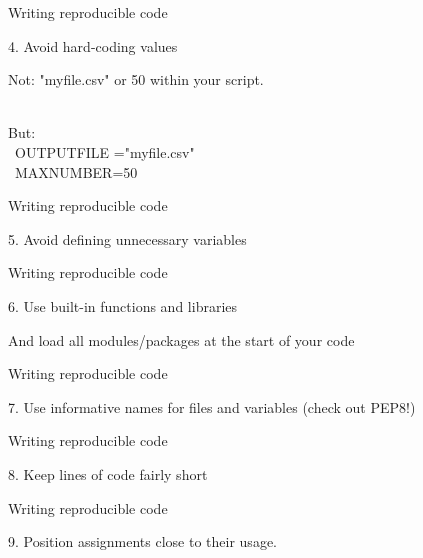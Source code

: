 \documentclass[compress]{beamer}
\begin{document}
\begin{frame}{Writing reproducible code}
	
4. Avoid hard-coding values

Not:
"myfile.csv" or 50 within your script. \\\

But: \\\
OUTPUTFILE ="myfile.csv" \\\
MAXNUMBER=50
\end{frame}


\begin{frame}{Writing reproducible code}

5. Avoid defining unnecessary variables 

\end{frame}


\begin{frame}{Writing reproducible code}
	
6. Use built-in functions and libraries 

And load all modules/packages at the start of your code
	
	
	
\end{frame}

\begin{frame}{Writing reproducible code}
	
7. Use informative names for files and variables (check out PEP8!)
	
\end{frame}


\begin{frame}{Writing reproducible code}
	
8. Keep lines of code fairly short


\end{frame}


\begin{frame}{Writing reproducible code}
	
9. Position assignments close to their usage.

	
\end{frame}
\end{document}
